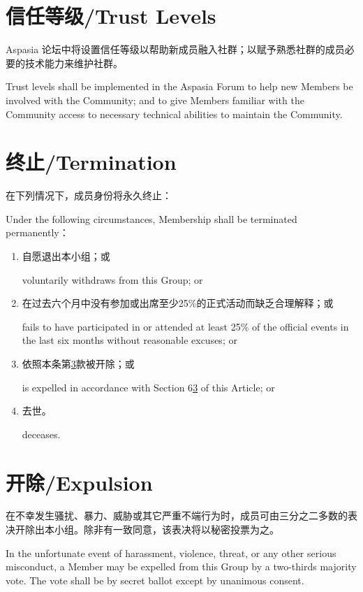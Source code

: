 \documentclass[12pt]{aspasia-constitution}
\begin{document}
	\section{信任等级/Trust Levels} \label{sec:trustlevels}
	
	Aspasia 论坛中将设置信任等级以帮助新成员融入社群；以赋予熟悉社群的成员必要的技术能力来维护社群。
	
	Trust levels shall be implemented in the Aspasia Forum to help new Members be involved with the Community; and to give Members familiar with the Community access to necessary technical abilities to maintain the Community.

	\section{终止/Termination} \label{sec:termination}
	
	在下列情况下，成员身份将永久终止：
	
	Under the following circumstances, Membership shall be terminated permanently：
	
	\begin{enumerate}[leftmargin=1.25cm]
		\item 自愿退出本小组；或\par
		voluntarily withdraws from this Group; or
		\item 在过去六个月中没有参加或出席至少25\%的正式活动而缺乏合理解释；或\par
		fails to have participated in or attended at least 25\% of the official events in the last six months without reasonable excuses; or
		\item 依照本条第\ref{sec:expulsion}款被开除；或\par
		is expelled in accordance with Section 6\ref{sec:expulsion} of this Article; or
		\item 去世。\par
		deceases.
	\end{enumerate}

	\section{开除/Expulsion} \label{sec:expulsion}
	
	在不幸发生骚扰、暴力、威胁或其它严重不端行为时，成员可由三分之二多数的表决开除出本小组。除非有一致同意，该表决将以秘密投票为之。
	
	In the unfortunate event of harassment, violence, threat, or any other serious misconduct, a Member may be expelled from this Group by a two-thirds majority vote. The vote shall be by secret ballot except by unanimous consent.
	
\end{document}
